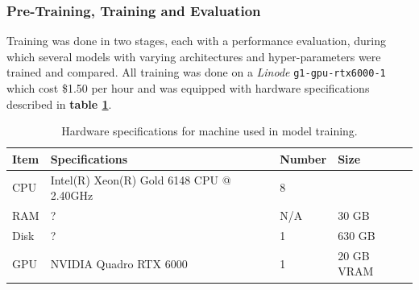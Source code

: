 \documentclass[16pt]{book}
\begin{document}
\subsubsection{Pre-Training, Training and Evaluation}

Training was done in two stages, each with a performance evaluation, during which several models with varying architectures and hyper-parameters were trained and compared.
All training was done on a \textit{Linode} \texttt{g1-gpu-rtx6000-1} which cost \$1.50 per hour and was equipped with hardware specifications described in \textbf{table \ref{hardwaretable}}.

\begin{table}
	\begin{center}
		\caption{\label{hardwaretable} Hardware specifications for machine used in model training.}
		\begin{tabular}{l|p{3cm}|l|l}
			\textbf{Item} & \textbf{Specifications} & \textbf{Number}  & \textbf{Size}\\
		\hline 
		CPU  & Intel(R) Xeon(R) Gold 6148 CPU @ 2.40GHz & 8 \\
		RAM  & ?  & N/A & 30 GB \\
		Disk & ?  & 1   & 630 GB \\
		GPU  & NVIDIA Quadro RTX 6000 & 1 & 20 GB VRAM \\ 

	\end{tabular}
	\end{center}
\end{table}
\end{document}
